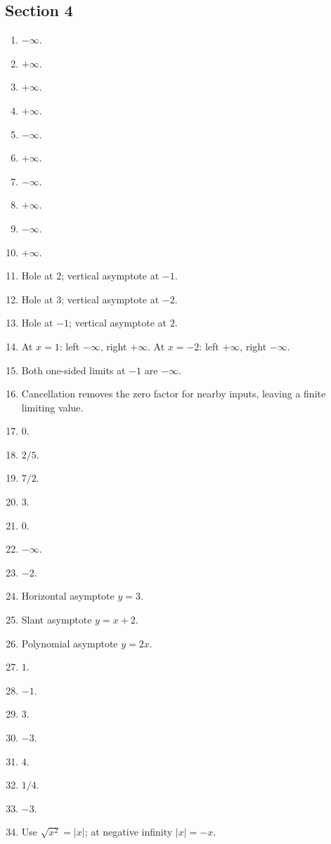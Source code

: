 \subsection*{Section 4}

\begin{enumerate}[label=\textbf{4.\arabic*}]
  \item \(-\infty\).
  \item \(+\infty\).
  \item \(+\infty\).
  \item \(+\infty\).
  \item \(-\infty\).
  \item \(+\infty\).
  \item \(-\infty\).
  \item \(+\infty\).
  \item \(-\infty\).
  \item \(+\infty\).
  \item Hole at \(2\); vertical asymptote at \(-1\).
  \item Hole at \(3\); vertical asymptote at \(-2\).
  \item Hole at \(-1\); vertical asymptote at \(2\).
  \item At \(x=1\): left \(-\infty\), right \(+\infty\). At \(x=-2\): left \(+\infty\), right \(-\infty\).
  \item Both one-sided limits at \(-1\) are \(-\infty\).
  \item Cancellation removes the zero factor for nearby inputs, leaving a finite limiting value.
  \item \(0\).
  \item \(2/5\).
  \item \(7/2\).
  \item \(3\).
  \item \(0\).
  \item \(-\infty\).
  \item \(-2\).
  \item Horizontal asymptote \(y=3\).
  \item Slant asymptote \(y=x+2\).
  \item Polynomial asymptote \(y=2x\).
  \item \(1\).
  \item \(-1\).
  \item \(3\).
  \item \(-3\).
  \item \(4\).
  \item \(1/4\).
  \item \(-3\).
  \item Use \(\sqrt{x^2}=|x|\); at negative infinity \(|x|=-x\).

\end{enumerate}
